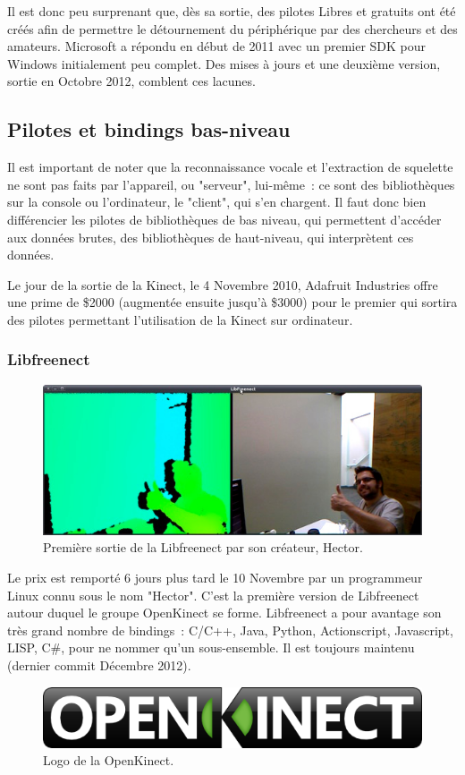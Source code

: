 Il est donc peu surprenant que, dès sa sortie, des pilotes Libres et gratuits
ont été créés afin de permettre le détournement du périphérique par des
chercheurs et des amateurs. Microsoft a répondu en début de 2011 avec un
premier SDK pour Windows initialement peu complet. Des mises à jours et une
deuxième version, sortie en Octobre 2012, comblent ces lacunes\cite{wiki_kinect}.

\subsection{Pilotes et bindings bas-niveau}

Il est important de noter que la reconnaissance vocale et l'extraction de 
squelette ne sont pas faits par l'appareil, ou "serveur", lui-même~: ce sont des
bibliothèques sur la console ou l'ordinateur, le "client", qui s'en chargent. 
Il faut donc bien
différencier les pilotes de bibliothèques de bas niveau, qui permettent 
d'accéder aux données brutes, des
bibliothèques de haut-niveau, qui interprètent ces données.

Le jour de la sortie de la Kinect, le 4 Novembre 2010, Adafruit Industries 
offre une prime de \$2000 (augmentée ensuite jusqu'à \$3000) pour le premier qui
sortira des pilotes permettant l'utilisation de la Kinect sur ordinateur\cite{adafruit_bounty}.

\subsubsection{Libfreenect}
\begin{figure}[h!]
\centering
\includegraphics[width=\linewidth]{images/hector}
\caption{Première sortie de la Libfreenect par son créateur, Hector.}
\end{figure}
Le prix est remporté 6 jours plus tard le 10 Novembre par un programmeur Linux
connu sous le nom "Hector"\cite{adafruit_winner}. C'est la première version de Libfreenect autour
duquel le groupe OpenKinect se forme. Libfreenect a pour avantage son
très grand nombre de bindings~: C/C++, Java, Python, Actionscript, Javascript,
LISP, C\#, pour ne nommer qu'un sous-ensemble. 
Il est toujours maintenu (dernier commit Décembre 2012).
\begin{figure}[h!]
\centering
\includegraphics[width=0.5\linewidth]{images/openkinect_logo}
\caption{Logo de la OpenKinect.}
\end{figure}

